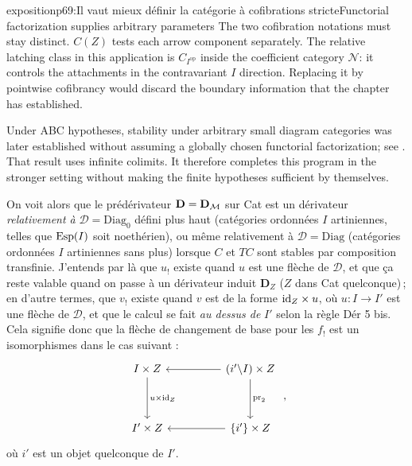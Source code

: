 \begin{dcomment}{exposition}{p69:Il vaut mieux définir la catégorie à cofibrations stricte}{Functorial factorization supplies arbitrary parameters}
The two cofibration notations must stay distinct. $C(Z)$ tests each arrow component separately. The relative latching class in this application is $C_{I^{\mathrm{op}}}$ inside the coefficient category $\mathcal N$: it controls the attachments in the contravariant $I$ direction. Replacing it by pointwise cofibrancy would discard the boundary information that the chapter has established.

Under ABC hypotheses, stability under arbitrary small diagram categories was later established without assuming a globally chosen functorial factorization; see \citet[Theorem 1.24]{Lenz2018}. That result uses infinite colimits. It therefore completes this program in the stronger setting without making the finite hypotheses sufficient by themselves.
\end{dcomment}


On voit alors que le prédérivateur $\mathbf{D} = \mathbf{D}_{\mathcal{M}}$ sur Cat est un dérivateur \textit{relativement à} $\mathcal{D} = \mathrm{Diag}_0$ défini plus haut (catégories ordonnées $I$ artiniennes, telles que $\operatorname{Esp}(I)$ soit noethérien), ou même relativement à $\mathcal{D} = \mathrm{Diag}$ (catégories ordonnées $I$ artiniennes sans plus) lorsque $C$ et $TC$ sont stables par composition transfinie. J'entends par là que $u_!$ existe quand $u$ est une flèche de $\mathcal{D}$,
et que ça reste valable quand on passe à un dérivateur induit $\mathbf{D}_Z$ ($Z$ dans Cat quelconque)\,; en d'autre termes, que $v_!$ existe quand $v$ est de la forme $\mathrm{id}_Z\times u$, où $u : I\longrightarrow I'$ est une %
flèche de $\mathcal{D}$, et que le calcul se fait \textit{au dessus de} $I'$ selon la règle Dér 5 bis. Cela signifie donc que la flèche de changement de base pour les $f_!$ est un isomorphismes dans le cas %
suivant :
\[
\begin{tikzcd}[row sep=huge, column sep=huge]
I\times Z \arrow[d, "u\times\id_Z"] & (i'\backslash I)\times Z \arrow[l] \arrow[d, "\pr_2"] \\
I'\times Z & \{i'\}\times Z \arrow[l]
\end{tikzcd}
\ ,
\]
où $i'$ est un objet quelconque de $I'$.


